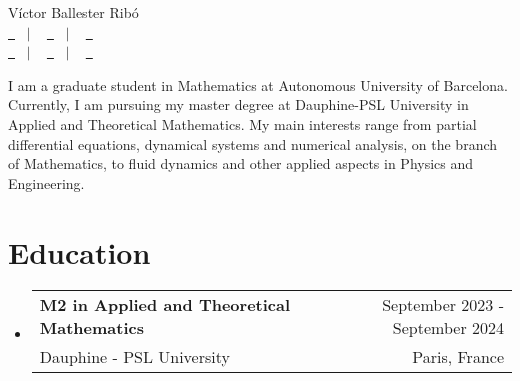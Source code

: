 \documentclass[a4paper,11pt]{article}
\makeatletter
\newcommand{\resumeQuadHeading}[4]{
  \item
  \begin{tabular*}{0.96\textwidth}[t]{l@{\extracolsep{\fill}}r}
    \textbf{#1} & \small #2 \\
    \small#3 & \small #4 \\
  \end{tabular*}
}
\newcommand{\resumeHeadingListStart}{
  \begin{itemize}[leftmargin=0.15in, label={}]
}
\newcommand{\resumeHeadingListEnd}{\end{itemize}}
\makeatother
\begin{document}
\begin{center}
  {\Huge Víctor Ballester Ribó\vspace{2pt}} \\[1.25pc]
  \href{https://victorballester7.github.io}{\faLink \ } \ $|$ \ %
  \href{https://www.linkedin.com/in/victorballester7}{\faLinkedinSquare \ } \ $|$ \ %
  \href{https://www.github.com/victorballester7}{\faGithub \ } \\[0.1pc] %
  \href{tel:+33765750262}{\faPhone \ } \ $|$ \ %
  \href{mailto:victor.ballester-ribo@dauphine.eu}{\faEnvelope \ } \ $|$ \ %
  \href{https://maps.app.goo.gl/mBsBKy4iHiBFkVGz5}{\faHome \ } \\[1.5pc] %
\end{center}

\begin{justify}
  I am a graduate student in Mathematics at Autonomous University of Bar\-ce\-lo\-na. Currently, I am pursuing my master degree at Dauphine-PSL University in Applied and Theoretical Mathematics. My main interests range from partial differential equations, dynamical systems and numerical analysis, on the branch of Math\-e\-mat\-ics, to fluid dynamics and other applied aspects in Physics and Engineering.
\end{justify}



\section{Education}
\resumeHeadingListStart{}
\resumeQuadHeading{M2 in Applied and Theoretical Mathematics}{September 2023 - September 2024}
{Dauphine - PSL University}{Paris, France}
\resumeHeadingListEnd{}
\end{document}
